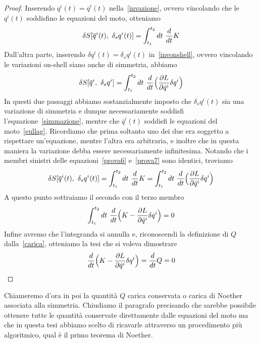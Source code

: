     \begin{proof}
        Inserendo $q^i(t) = \overline q^i(t)$ nella~\eqref{invazione}, ovvero vincolando che le $q^i(t)$ soddisfino le equazioni del moto, otteniamo 
    \begin{equation}\label{prova6}
        \delta S[\overline q^i(t), ~\delta_s q^i(t)] = \int_{t_1}^{t_2}dt~ \frac{d}{dt} K
    \end{equation}
        Dall'altra parte, inserendo $\delta q^i(t) = \delta_s q^i(t)$ in~\eqref{invonshell}, ovvero vincolando le variazioni on-shell siano anche di simmetria, abbiamo
    \begin{equation}\label{prova7}
        \delta S[\overline q^i,~\delta_s q^i] = \int_{t_1}^{t_2}dt~ \frac{d}{dt} \Big( \frac{\partial L}{\partial\dot q^i} \delta q^i \Big )
    \end{equation}
        In questi due passaggi abbiamo sostanzialmente imposto che $\delta_s q^i(t)$ sia una variazione di simmetria e dunque necessariamente soddisfi l'equazione~\eqref{simmazione}, mentre che $\overline q^i(t)$ soddisfi le equazioni del moto~\eqref{eullag}. Ricordiamo che prima soltanto uno dei due era soggetto a rispettare un'equazione, mentre l'altra era arbitraria, e inoltre che in questa maniera la variazione debba essere necessariamente infinitesima. Notando che i membri sinistri delle equazioni~\eqref{prova6} e~\eqref{prova7} sono identici, troviamo
    \begin{equation*}
        \delta S[\overline q^i(t), ~\delta_s q^i(t)] = \int_{t_1}^{t_2}dt~ \frac{d}{dt} K = \int_{t_1}^{t_2}dt~ \frac{d}{dt} \Big( \frac{\partial L}{\partial\dot q^i} \delta q^i \Big )
    \end{equation*}
        A questo punto sottraiamo il secondo con il terzo membro
    \begin{equation*}
        \int_{t_1}^{t_2}dt~ \frac{d}{dt} \Big (K - \frac{\partial L}{\partial\dot q^i} \delta q^i \Big ) = 0
    \end{equation*}
        Infine avremo che l'integranda si annulla e, riconoscendi la definizione di $Q$ dalla~\eqref{carica}, otteniamo la tesi che si voleva dimostrare
    \begin{equation*}
        \frac{d}{dt} \Big (K - \frac{\partial L}{\partial\dot q^i} \delta q^i \Big ) = \frac{d}{dt} Q = 0
    \end{equation*}
    \end{proof}
    Chiameremo d'ora in poi la quantità $Q$ carica conservata o carica di Noether associata alla simmetria. Chiudiamo il paragrafo precisando che sarebbe possibile ottenere tutte le quantità conservate direttamente dalle equazioni del moto ma che in questa tesi abbiamo scelto di ricavarle attraverso un procedimento più algoritmico, qual è il primo teorema di Noether. 

